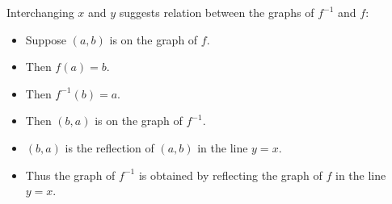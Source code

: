 \begin{frame}
Interchanging $x$ and $y$ suggests relation between the graphs of $f^{-1}$ and $f$:
\begin{itemize}
\item<2->  Suppose $(a,b)$ is on the graph of $f$.
\item<3->  Then $f(a) = b$.
\item<4->  Then $f^{-1}(b) = a$.
\item<5->  Then $(b,a)$ is on the graph of $f^{-1}$.
\item<6->  $(b,a)$ is the reflection of $(a,b)$ in the line $y = x$.
\item<7->  Thus the graph of $f^{-1}$ is obtained by reflecting the graph of $f$ in the line $y = x$.
\end{itemize}
\end{frame}

